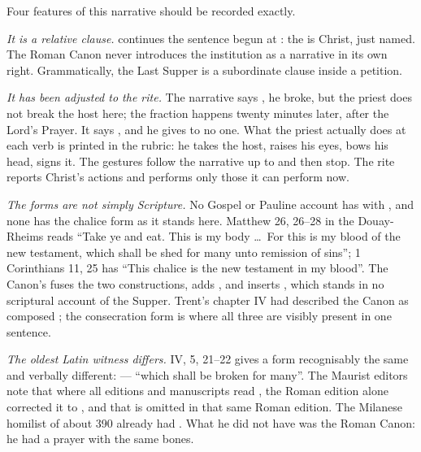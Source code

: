 Four features of this narrative should be recorded exactly.

\emph{It is a relative clause.}  continues
the sentence begun at : the  is Christ, just named. The Roman Canon never
introduces the institution as a narrative in its own right. Grammatically, the
Last Supper is a subordinate clause inside a petition.

\emph{It has been adjusted to the rite.} The narrative says
, he broke, but the priest does not break the host here; the
fraction happens twenty minutes later, after the Lord's Prayer. It says
, and he gives to no one. What the priest
actually does at each verb is printed in the rubric: he takes the host, raises
his eyes, bows his head, signs it. The gestures follow the narrative up to
 and then stop. The rite reports Christ's actions and
performs only those it can perform now.

\emph{The forms are not simply Scripture.} No Gospel or Pauline account has
 with , and none has the
chalice form as it stands here. Matthew 26, 26--28 in the Douay-Rheims reads
``Take ye and eat. This is my body \dots\ For this is my blood of the new
testament, which shall be shed for many unto remission of sins''; 1 Corinthians
11, 25 has ``This chalice is the new testament in my blood''. The Canon's
 fuses
the two constructions, adds , and inserts
, which stands in no scriptural account of the
Supper. Trent's chapter IV had described the Canon as composed
; the consecration form is
where all three are visibly present in one sentence.

\emph{The oldest Latin witness differs.}  IV, 5, 21--22
gives a form recognisably the same and verbally different:
 --- ``which shall be broken for many''. The Maurist editors
note that where all editions and manuscripts read , the Roman edition alone corrected it to , and that  is omitted in that same Roman
edition. The Milanese homilist of about 390 already had . What he did not have was the Roman Canon: he had a
prayer with the same bones.

